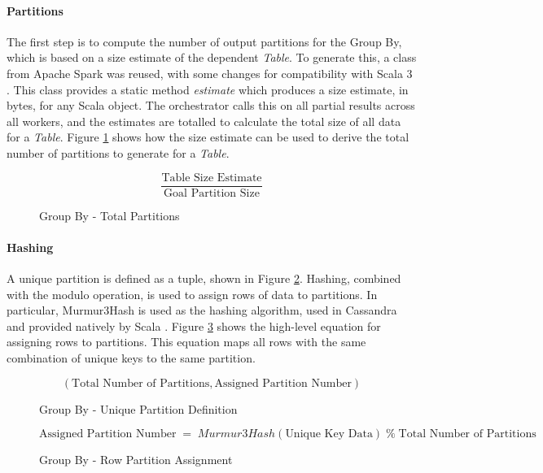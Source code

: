 \paragraph{Partitions}
The first step is to compute the number of output partitions for the Group By, which is based on a size estimate of the dependent \textit{Table}. To generate this, a class from Apache Spark was reused, with some changes for compatibility with Scala 3 \cite{zaharia2016spark}. This class provides a static method \textit{estimate} which produces a size estimate, in bytes, for any Scala object. The orchestrator calls this on all partial results across all workers, and the estimates are totalled to calculate the total size of all data for a \textit{Table}. Figure \ref{fig:group-by-num-partitions} shows how the size estimate can be used to derive the total number of partitions to generate for a \textit{Table}.

\begin{figure}[h]
	\centering
	\[ \frac{\text{Table Size Estimate}}{\text{Goal Partition Size}} \]
	\caption{Group By - Total Partitions}
	\label{fig:group-by-num-partitions}
\end{figure}


\pagebreak
\paragraph{Hashing} 
A unique partition is defined as a tuple, shown in Figure \ref{fig:group-by-unique-partition}. Hashing, combined with the modulo operation, is used to assign rows of data to partitions. In particular, Murmur3Hash is used as the hashing algorithm, used in Cassandra and provided natively by Scala \cite{murmur3hash}. Figure \ref{fig:group-by-partition-assign} shows the high-level equation for assigning rows to partitions. This equation maps all rows with the same combination of unique keys to the same partition.

\begin{figure}[h]
	\centering
	\[ (\text{Total Number of Partitions}, \text{Assigned Partition Number}) \]
	\caption{Group By - Unique Partition Definition}
	\label{fig:group-by-unique-partition}
\end{figure} 

\begin{figure}[h]
	\centering
	\[ \text{Assigned Partition Number} \; = \; Murmur3Hash(\text{Unique Key Data}) \; \%  \; \text{Total Number of Partitions} \]
	\caption{Group By - Row Partition Assignment}
	\label{fig:group-by-partition-assign}
\end{figure} 

